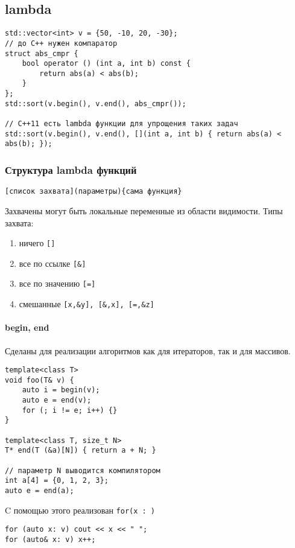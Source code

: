 \subsection{lambda}
\begin{verbatim}
std::vector<int> v = {50, -10, 20, -30};
// до С++ нужен компаратор
struct abs_cmpr {
    bool operator () (int a, int b) const {
	    return abs(a) < abs(b);
	}
};
std::sort(v.begin(), v.end(), abs_cmpr());

// С++11 есть lambda функции для упрощения таких задач 
std::sort(v.begin(), v.end(), [](int a, int b) { return abs(a) < abs(b); });
\end{verbatim}
\subsubsection{Структура lambda функций}
\begin{verbatim}
[список захвата](параметры){сама функция}
\end{verbatim}
Захвачены могут быть локальные переменные из области видимости. Типы захвата:
\begin{enumerate}[noitemsep]
	\item ничего \texttt{[]}
	\item все по ссылке \texttt{[\&]}
	\item все по значению \texttt{[=]}
	\item смешанные \texttt{[x,\&y], [\&,x], [=,\&z]}
\end{enumerate} 
\paragraph{begin, end} 
Сделаны для реализации алгоритмов как для итераторов, так и для массивов.
\begin{verbatim}
template<class T>
void foo(T& v) {
    auto i = begin(v);
	auto e = end(v);
	for (; i != e; i++) {}
}

template<class T, size_t N>
T* end(T (&a)[N]) { return a + N; }

// параметр N выводится компилятором
int a[4] = {0, 1, 2, 3};
auto e = end(a);
\end{verbatim}
C помощью этого реализован \texttt{for(x : )}
\begin{verbatim}
for (auto x: v) cout << x << " ";
for (auto& x: v) x++;
\end{verbatim}
